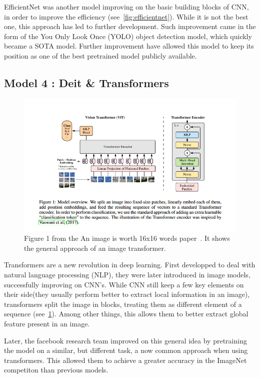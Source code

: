 \documentclass[11pt]{article}
\begin{document}
    EfficientNet was another model improving on the basic building blocks of CNN, in order to improve the efficiency (see~\ref{fig:efficientnet}). While it is
    not the best one, this approach has led to further development. Such improvement came in the form of the You Only Look Once (YOLO) object detection
    model, which quickly became a SOTA model. Further improvement have allowed this model to keep its position as one of the best pretrained model publicly available.

    \subsection{Model 4 : Deit \& Transformers~\cite{deit}~\cite{image16x16}}


        \begin{figure}[H]

             \centering
             \includegraphics[width=0.8 \textwidth]{plots/transformer}
             \caption{Figure 1 from the An image is worth 16x16 words paper~\cite{image16x16}. It shows the general approach of an image transformer.}
             \label{fig:transformer}

        \end{figure}

        Transformers are a new revolution in deep learning. First developped to deal with natural language processing (NLP),
        they were later introduced in image models, successfully improving on CNN's. While CNN still keep a few key
        elements on their side(they usually perform better to extract local information in an image), transformers split the image in blocks,
        treating them as different element of a sequence (see~\ref{fig:transformer}). Among other things, this allows them to better extract global feature present in an image.

        Later, the facebook research team improved on this general idea by pretraining the model on a similar, but different task, a now
        common approach when using transformers. This allowed them to achieve a greater accuracy in the ImageNet competiton than previous models.
\end{document}
